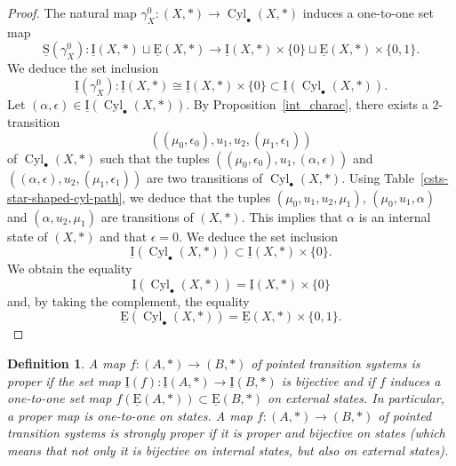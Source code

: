 \documentclass[a4paper,12pt]{amsart}
\newtheorem{defn}[thm]{Definition}
\begin{document}
\begin{proof} The natural map $\gamma^0_X: (X,*) \to \operatorname{{Cyl}}_\bullet(X,*)$
induces a one-to-one set map \[\operatorname{\underline{S}}(\gamma^0_X):\operatorname{\underline{I}}(X,*) \sqcup \operatorname{\underline{E}}(X,*) \longrightarrow 
\operatorname{\underline{I}}(X,*) \times \{0\} \sqcup \operatorname{\underline{E}}(X,*)\times \{0,1\}.\]  We deduce the set inclusion
\[\operatorname{\underline{I}}(\gamma^0_X): \operatorname{\underline{I}}(X,*) {\cong} \operatorname{\underline{I}}(X,*)\times \{0\} \subset \operatorname{\underline{I}}(\operatorname{{Cyl}}_\bullet(X,*)).\] 
Let $(\alpha,\epsilon)\in \operatorname{\underline{I}}(\operatorname{{Cyl}}_\bullet(X,*))$. By
Proposition~\ref{int_charac}, there exists a $2$-transition
\[((\mu_0,\epsilon_0),u_1,u_2,(\mu_1,\epsilon_1))\] of
$\operatorname{{Cyl}}_\bullet(X,*)$ such that the tuples
$((\mu_0,\epsilon_0),u_1,(\alpha,\epsilon))$ and
$((\alpha,\epsilon),u_2,(\mu_1,\epsilon_1))$ are two transitions of
$\operatorname{{Cyl}}_\bullet(X,*)$. Using Table~\ref{csts-star-shaped-cyl-path}, we
deduce that the tuples $(\mu_0,u_1,u_2,\mu_1)$, $(\mu_0,u_1,\alpha)$
and $(\alpha,u_2,\mu_1)$ are transitions of $(X,*)$.  This implies
that $\alpha$ is an internal state of $(X,*)$ and that
$\epsilon=0$. We deduce the set inclusion
\[\operatorname{\underline{I}}(\operatorname{{Cyl}}_\bullet(X,*)) \subset
\operatorname{\underline{I}}(X,*)\times \{0\}.\] We obtain the equality \[\operatorname{\underline{I}}(\operatorname{{Cyl}}_\bullet(X,*))
= \operatorname{\underline{I}}(X,*)\times \{0\} \] and, by taking the complement, the equality
 \[\operatorname{\underline{E}}(\operatorname{{Cyl}}_\bullet(X,*)) = \operatorname{\underline{E}}(X,*)\times \{0,1\}.\]
\end{proof}

\begin{defn} A map $f:(A,*)\to (B,*)$ of pointed transition systems is {\rm
  proper} if the set map $\operatorname{\underline{I}}(f):\operatorname{\underline{I}}(A,*) \to \operatorname{\underline{I}}(B,*)$ is
bijective and if $f$ induces a one-to-one set map $f(\operatorname{\underline{E}}(A,*))\subset
\operatorname{\underline{E}}(B,*)$ on external states. In particular, a proper map is
one-to-one on states. A map $f:(A,*)\to (B,*)$ of pointed transition
systems is {\rm strongly proper} if it is proper and bijective on
states (which means that not only it is bijective on internal states,
but also on external states).\end{defn}
\end{document}
